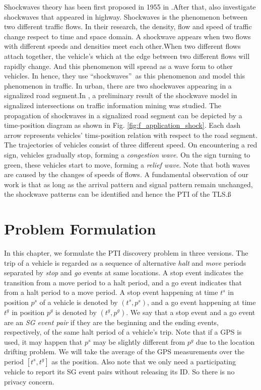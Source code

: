 \documentclass[final,oneside,onecolumn,12pt,a4paper]{book}%
\begin{document}
Shockwaves theory has been first proposed in 1955 in
\cite{Lighthill1955KinematicI}\cite{Lighthill1955KinematicII}.After that,
\cite{Richard1956Shock} also investigate shockwaves that appeared in highway.
Shockwaves is the phenomenon between two different traffic flows. In their
research, the density, flow and speed of traffic change respect to time and
space domain. A shockwave appears when two flows with different speeds and
densities meet each other.When two different flows attach together, the
vehicle's which at the edge between two different flows will rapidly change.
And this phenomenon will spread as a wave form to other vehicles. In hence,
they use \textquotedblleft shockwaves\textquotedblright\ as this phenomenon
and \cite{Stephanopoulos1979Modeling}\cite{Michalopoulos1981application} model
this phenomenon in traffic. In urban, there are two shockwaves appearing in a
signalized road segment.In \cite{Chuang2013Crowdsourced}, a preliminary result
of the shockwave model in signalized intersections on traffic information
mining was studied. The propagation of shockwaves in a signalized road segment
can be depicted by a time-position diagram as shown in Fig.
\ref{fig:f_application_shock}. Each dash arrow represents vehicles'
tims-position relation with respect to the road segment. The trajectories of
vehicles consist of three different speed. On encountering a red sign,
vehicles gradually stop, forming a \emph{congestion wave}. On the sign turning
to green, these vehicles start to move, forming a \emph{relief wave}. Note
that both waves are caused by the changes of speeds of flows. A fundamental
observation of our work is that as long as the arrival pattern and signal
pattern remain unchanged, the shockwave patterns can be identified and hence
the PTI of the TLS.\ss 

\chapter{Problem Formulation}

\label{cha:problem_formulation}

In this chapter, we formulate the PTI discovery problem in three versions. The
trip of a vehicle is regarded as a sequence of alternative \emph{halt} and
\emph{move} periods separated by \emph{stop} and \emph{go} events at same
locations. A stop event indicates the transition from a move period to a halt
period, and a go event indicates that from a halt period to a move period. A
stop event happening at time $t^{s}$ in position $p^{s}$ of a vehicle is
denoted by $\left(  t^{s},p^{s}\right)  $, and a go event happening at time
$t^{g}$ in position $p^{g}$ is denoted by $\left(  t^{g},p^{g}\right)  $. We
say that a stop event and a go event are an \emph{SG event pair} if they are
the beginning and the ending events, respectively, of the same halt period of
a vehicle's trip. Note that if a GPS is used, it may happen that $p^{s}$ may
be slightly different from $p^{g}$ due to the location drifting problem. We
will take the average of the GPS measurements over the period $\left[
t^{s},t^{g}\right]  $ as the position. Also note that we only need a
participating vehicle to report its SG event pairs without releasing its ID.
So there is no privacy concern.
\end{document}
